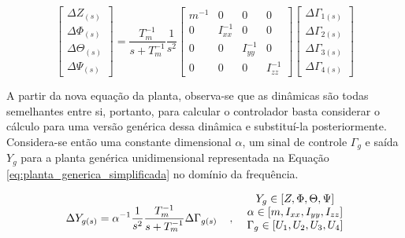 \documentclass[main.tex]{subfiles}
\begin{document}
	\begin{equation}\label{eq:modelo_simplificado_final_pid}
		\begin{bmatrix}
			\Delta Z_{(s)}\\
			\Delta \Phi_{(s)}\\
			\Delta \Theta_{(s)}\\
			\Delta \Psi_{(s)}
		\end{bmatrix} = \frac{T_m^{-1}}{s + T_m^{-1}}\frac{1}{s^2}\begin{bmatrix}
			m^{-1} & 0 & 0 & 0\\
			
			0 & I_{xx}^{-1} & 0 & 0\\
			
			0 & 0 & I_{yy}^{-1} & 0\\
			
			0 & 0 & 0 & I_{zz}^{-1}
		\end{bmatrix}\begin{bmatrix}
			\Delta \Gamma_{1(s)}\\
			\Delta \Gamma_{2(s)}\\
			\Delta \Gamma_{3(s)}\\
			\Delta \Gamma_{4(s)}
		\end{bmatrix}
	\end{equation}
	
	A partir da nova equação da planta, observa-se que as dinâmicas são todas semelhantes entre si, portanto, para calcular o controlador basta considerar o cálculo para uma versão genérica dessa dinâmica e substituí-la posteriormente. Considera-se então uma constante dimensional $\alpha$, um sinal de controle $\Gamma_g$ e saída $Y_g$ para a planta genérica unidimensional representada na Equação \ref{eq:planta_generica_simplificada} no domínio da frequência.
	
	\begin{equation}\label{eq:planta_generica_simplificada}
		\Delta Y_{g(s)} = \alpha^{-1}\frac{1}{s^2}\frac{T_m^{-1}}{s + T_m^{-1}}\Delta \Gamma_{g(s)}\hspace{0.4cm},\hspace{0.4cm} \begin{matrix}
			Y_g \in [Z, \Phi, \Theta, \Psi]\\
			\alpha \in [m, I_{xx}, I_{yy}, I_{zz}]\\\vspace{0.2cm}
			\Gamma_g \in [U_1, U_2, U_3, U_4]\vspace{0.2cm}
		\end{matrix}
	\end{equation}
	
\end{document}
